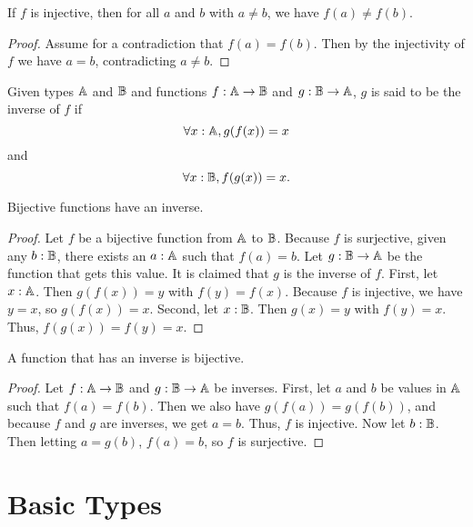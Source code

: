 \documentclass[../../math.tex]{subfiles}
\begin{document}
\begin{theorem}
    If $f$ is injective, then for all $a$ and $b$ with $a \neq b$, we have $f(a)
    \neq f(b)$.
\end{theorem}
\begin{proof}
    Assume for a contradiction that $f(a) = f(b)$.  Then by the injectivity of
    $f$ we have $a = b$, contradicting $a \neq b$.
\end{proof}

\begin{definition}
    Given types $\mathbb{A}$ and $\mathbb{B}$ and functions $f : \mathbb{A} \rightarrow \mathbb{B}$ and $g : \mathbb{B}
    \rightarrow \mathbb{A}$, $g$ is said to be the inverse of $f$ if
    \[
        \forall x : \mathbb{A}, g(f(x)) = x
    \]
    and
    \[
        \forall x : \mathbb{B}, f(g(x)) = x.
    \]
\end{definition}

\begin{theorem} \label{bijective_inverse_ex}
    Bijective functions have an inverse.
\end{theorem}
\begin{proof}
    Let $f$ be a bijective function from $\mathbb{A}$ to $\mathbb{B}$.  Because $f$ is
    surjective, given any $b : \mathbb{B}$, there exists an $a : \mathbb{A}$ such that $f(a) =
    b$.  Let $g : \mathbb{B} \rightarrow \mathbb{A}$ be the function that gets this value.  It
    is claimed that $g$ is the inverse of $f$.  First, let $x : \mathbb{A}$.  Then
    $g(f(x)) = y$ with $f(y) = f(x)$.  Because $f$ is injective, we have $y =
    x$, so $g(f(x)) = x$.  Second, let $x : \mathbb{B}$.  Then $g(x) = y$ with $f(y) =
    x$.  Thus, $f(g(x)) = f(y) = x$.
\end{proof}

\begin{instance} \label{inverse_ex_bijective}
    A function that has an inverse is bijective.
\end{instance}
\begin{proof}
    Let $f : \mathbb{A} \rightarrow \mathbb{B}$ and $g : \mathbb{B} \rightarrow \mathbb{A}$ be inverses.  First,
    let $a$ and $b$ be values in $\mathbb{A}$ such that $f(a) = f(b)$.  Then we also
    have $g(f(a)) = g(f(b))$, and because $f$ and $g$ are inverses, we get $a =
    b$.  Thus, $f$ is injective.  Now let $b : \mathbb{B}$.  Then letting $a = g(b)$,
    $f(a) = b$, so $f$ is surjective.
\end{proof}

\section{Basic Types} \label{sec_types}
\end{document}
